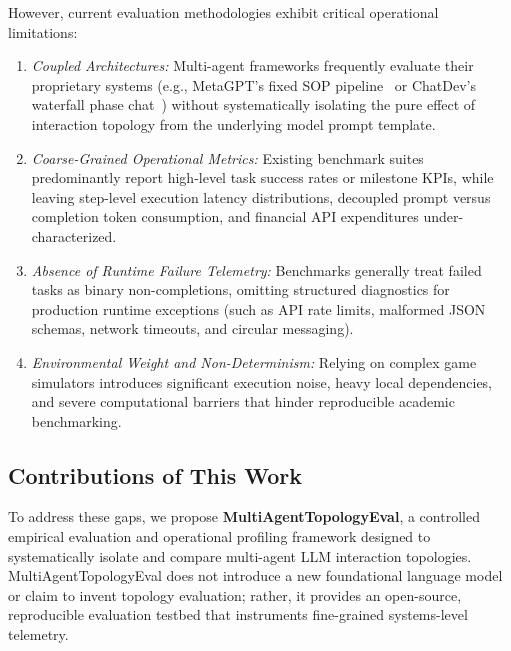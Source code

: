 However, current evaluation methodologies exhibit critical operational limitations:
\begin{enumerate}
    \item \textit{Coupled Architectures:} Multi-agent frameworks frequently evaluate their proprietary systems (e.g., MetaGPT's fixed SOP pipeline~\cite{Hong2024MetaGPT} or ChatDev's waterfall phase chat~\cite{Qian2024Communicative}) without systematically isolating the pure effect of interaction topology from the underlying model prompt template.
    \item \textit{Coarse-Grained Operational Metrics:} Existing benchmark suites predominantly report high-level task success rates or milestone KPIs, while leaving step-level execution latency distributions, decoupled prompt versus completion token consumption, and financial API expenditures under-characterized.
    \item \textit{Absence of Runtime Failure Telemetry:} Benchmarks generally treat failed tasks as binary non-completions, omitting structured diagnostics for production runtime exceptions (such as API rate limits, malformed JSON schemas, network timeouts, and circular messaging).
    \item \textit{Environmental Weight and Non-Determinism:} Relying on complex game simulators introduces significant execution noise, heavy local dependencies, and severe computational barriers that hinder reproducible academic benchmarking.
\end{enumerate}

\subsection{Contributions of This Work}
To address these gaps, we propose \textbf{MultiAgentTopologyEval}, a controlled empirical evaluation and operational profiling framework designed to systematically isolate and compare multi-agent LLM interaction topologies. MultiAgentTopologyEval does not introduce a new foundational language model or claim to invent topology evaluation; rather, it provides an open-source, reproducible evaluation testbed that instruments fine-grained systems-level telemetry.

